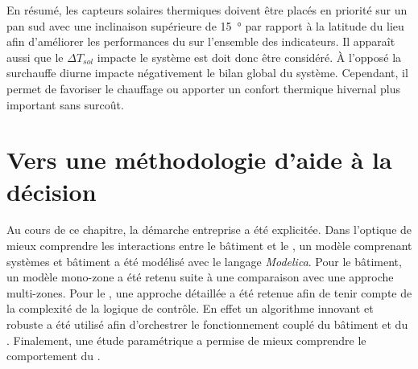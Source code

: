 En résumé, les capteurs solaires thermiques doivent être placés en priorité sur un pan sud
avec une inclinaison supérieure de \SI{15}{\degree} par rapport à la latitude du lieu afin
d’améliorer les performances du  sur l’ensemble des indicateurs. Il apparaît aussi
que le $\Delta T_{sol}$ impacte le système est doit donc être considéré. À l’opposé la surchauffe
diurne impacte négativement le bilan global du système. Cependant, il permet de favoriser le
chauffage ou apporter un confort thermique hivernal plus important sans surcoût.





\section{Vers une méthodologie d’aide à la décision} %
\label{sec:vers_une_methodologie_d_aide_a_la_decision}
Au cours de ce chapitre, la démarche entreprise a été explicitée. Dans l’optique de mieux
comprendre les interactions entre le bâtiment et le , un modèle comprenant
systèmes et bâtiment a été modélisé avec le langage \textit{Modelica}. Pour le bâtiment, un
modèle mono-zone a été retenu suite à une comparaison avec une approche multi-zones.
Pour le , une approche détaillée a été retenue afin de tenir compte de la
complexité de la logique de contrôle. En effet un algorithme innovant et robuste a été
utilisé afin d’orchestrer le fonctionnement couplé du bâtiment et du .
Finalement, une étude paramétrique a permise de mieux comprendre le comportement du
.

